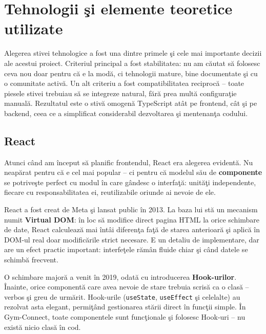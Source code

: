 \chapter{Tehnologii \c si elemente teoretice utilizate}

Alegerea stivei tehnologice a fost una dintre primele \c si cele mai
importante decizii ale acestui proiect. Criteriul principal a fost
stabilitatea: nu am c\u autat s\u a folosesc ceva nou doar pentru c\u a
e la mod\u a, ci tehnologii mature, bine documentate \c si cu o
comunitate activ\u a. Un alt criteriu a fost compatibilitatea
reciproc\u a -- toate piesele stivei trebuiau s\u a se integreze
natural, f\u ar\u a prea mult\u a configura\c tie manual\u a.
Rezultatul este o stiv\u a omogen\u a TypeScript at\^ at pe frontend,
c\^ at \c si pe backend, ceea ce a simplificat considerabil
dezvoltarea \c si mentenan\c ta codului.

\section{React}

Atunci c\^ and am \^ inceput s\u a planific frontendul, React
\cite{react2024} era alegerea evident\u a. Nu neap\u arat pentru
c\u a e cel mai popular -- ci pentru c\u a modelul s\u au de
\textbf{componente} se potrive\c ste perfect cu modul \^ in care
g\^ andesc o interfa\c t\u a: unit\u a\c ti independente, fiecare
cu responsabilitatea ei, reutilizabile oriunde ai nevoie de ele.

React a fost creat de Meta \c si lansat public \^ in 2013. La baza
lui st\u a un mecanism numit \textbf{Virtual DOM}: \^ in loc s\u a
modifice direct pagina HTML la orice schimbare de date, React
calculeaz\u a mai \^ int\^ ai diferen\c ta fa\c t\u a de starea
anterioar\u a \c si aplic\u a \^ in DOM-ul real doar modific\u arile
strict necesare. E un detaliu de implementare, dar are un efect
practic important: interfe\c tele r\u am\^ an fluide chiar \c si
c\^ and datele se schimb\u a frecvent.

O schimbare major\u a a venit \^ in 2019, odat\u a cu introducerea
\textbf{Hook-urilor}. \^ Inainte, orice component\u a care avea
nevoie de stare trebuia scris\u a ca o clas\u a -- verbos \c si
greu de urm\u arit. Hook-urile (\texttt{useState},
\texttt{useEffect} \c si celelalte) au rezolvat asta elegant,
permi\c t\^ and gestionarea st\u arii direct \^ in func\c tii simple.
\^ In Gym-Connect, toate componentele sunt func\c tionale \c si
folosesc Hook-uri -- nu exist\u a nicio clas\u a \^ in cod.

